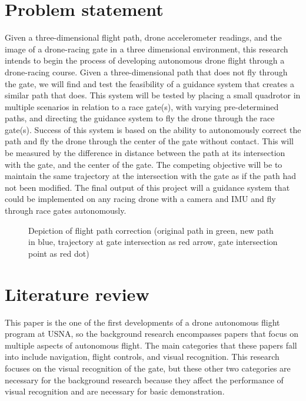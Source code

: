 \documentclass[onecolumn,10pt]{IEEEtran}
\newcommand{\myroot}{../}
\begin{document}
\section{Problem statement}
Given a three-dimensional flight path, drone accelerometer readings, and the image of a drone-racing gate in a three dimensional environment, this research intends to begin the process of developing autonomous drone flight through a drone-racing course. Given a three-dimensional path that does not fly through the gate, we will find and test the feasibility of a guidance system that creates a similar path that does. This system will be tested by placing a small quadrotor in multiple scenarios in relation to a race gate(s), with varying pre-determined paths, and directing the guidance system to fly the drone through the race gate(s). Success of this system is based on the ability to autonomously correct the path and fly the drone through the center of the gate without contact. This will be measured by the difference in distance between the path at its intersection with the gate, and the center of the gate. The competing objective will be to maintain the same trajectory at the intersection with the gate as if the path had not been modified. The final output of this project will a guidance system that could be implemented on any racing drone with a camera and IMU and fly through race gates autonomously.

\begin{figure}
\caption{Depiction of flight path correction (original path in green, new path in blue, trajectory at gate intersection as red arrow, gate intersection point as red dot)}
\label{fig:problem-statement}
\end{figure}

%




\section{Literature review}
This paper is the one of the first developments of a drone autonomous flight program at USNA, so the background research encompasses papers that focus on multiple aspects of autonomous flight. The main categories that these papers fall into include navigation, flight controls, and visual recognition. This research focuses on the visual recognition of the gate, but these other two categories are necessary for the background research because they affect the performance of visual recognition and are necessary for basic demonstration. 
\end{document}

